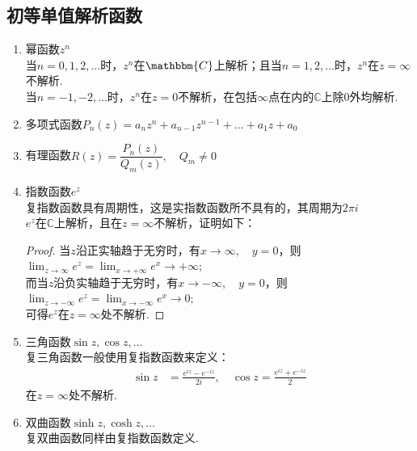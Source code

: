 \documentclass[lang=cn, titlestyle=display, scheme=chinese]{elegantbook}
\begin{document}
            \subsection{初等单值解析函数}
                \allowdisplaybreaks
                \begin{enumerate}
                    \item 幂函数$z^n$\\
                        当$n = 0,1,2,\dots$时，$z^n$在$\mathbbm{C}$上解析；且当$n = 1,2,\dots$时，$z^n$在$z = \infty$不解析.\\
                        当$n = -1,-2,\dots$时，$z^n$在$z = 0$不解析，在包括$\infty$点在内的$\mathbb{C}$上除$0$外均解析.
                    \item 多项式函数$P_n(z) = a_nz^n + a_{n-1}z^{n-1} + \dots + a_1z + a_0$
                    \item 有理函数$R(z) = \dfrac{P_n(z)}{Q_m(z)}, \quad Q_m \neq 0$
                    \item 指数函数$e^z$\\
                        复指数函数具有周期性，这是实指数函数所不具有的，其周期为$2 \pi i$\\
                        $e^z$在$\mathbb{C}$上解析，且在$z = \infty$不解析，证明如下：
                        \begin{proof}
                            当$z$沿正实轴趋于无穷时，有$x \to \infty, \quad y = 0$，则$\lim_{z \to \infty}e^z = \lim_{x \to +\infty}e^x \to +\infty$;\\
                            而当$z$沿负实轴趋于无穷时，有$x \to -\infty, \quad y = 0$，则$\lim_{z \to -\infty}e^z = \lim_{x \to -\infty}e^x \to 0$;\\
                            可得$e^z$在$z = \infty$处不解析.
                        \end{proof}
                    \item 三角函数$\sin{z}, \cos{z}, \dots$\\
                        复三角函数一般使用复指数函数来定义：
                        \begin{align*}
                            \sin{z} &= \frac{e^{iz} - e^{-iz}}{2i}, \quad \cos{z} = \frac{e^{iz} + e^{-iz}}{2}
                        \end{align*}
                        在$z = \infty$处不解析.
                    \item 双曲函数$\sinh{z}, \cosh{z}, \dots$\\
                        复双曲函数同样由复指数函数定义.

\end{enumerate}
\end{document}
